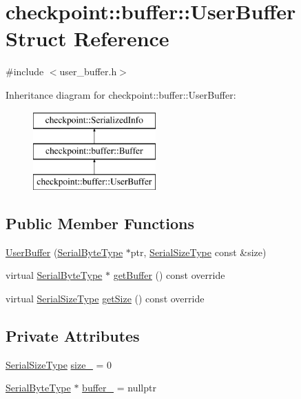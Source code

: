 \hypertarget{structcheckpoint_1_1buffer_1_1_user_buffer}{}\section{checkpoint\+:\+:buffer\+:\+:User\+Buffer Struct Reference}
\label{structcheckpoint_1_1buffer_1_1_user_buffer}


{\ttfamily \#include $<$user\+\_\+buffer.\+h$>$}

Inheritance diagram for checkpoint\+:\+:buffer\+:\+:User\+Buffer\+:\begin{figure}[H]
\begin{center}
\leavevmode
\includegraphics[height=3.000000cm]{structcheckpoint_1_1buffer_1_1_user_buffer}
\end{center}
\end{figure}
\subsection*{Public Member Functions}
\begin{DoxyCompactItemize}
\item 
\hyperlink{structcheckpoint_1_1buffer_1_1_user_buffer_a279907471bfa758ae71d922443973693}{User\+Buffer} (\hyperlink{namespacecheckpoint_ae57f01cdc0b81776c23b6c7c934c58f5}{Serial\+Byte\+Type} $\ast$ptr, \hyperlink{namespacecheckpoint_a083f6674da3f94c2901b18c6d238217c}{Serial\+Size\+Type} const \&size)
\item 
virtual \hyperlink{namespacecheckpoint_ae57f01cdc0b81776c23b6c7c934c58f5}{Serial\+Byte\+Type} $\ast$ \hyperlink{structcheckpoint_1_1buffer_1_1_user_buffer_a1a71a6378472d56c8c17f01dd44462b7}{get\+Buffer} () const override
\item 
virtual \hyperlink{namespacecheckpoint_a083f6674da3f94c2901b18c6d238217c}{Serial\+Size\+Type} \hyperlink{structcheckpoint_1_1buffer_1_1_user_buffer_a434e7feda041957509ee08791d3f4949}{get\+Size} () const override
\end{DoxyCompactItemize}
\subsection*{Private Attributes}
\begin{DoxyCompactItemize}
\item 
\hyperlink{namespacecheckpoint_a083f6674da3f94c2901b18c6d238217c}{Serial\+Size\+Type} \hyperlink{structcheckpoint_1_1buffer_1_1_user_buffer_ab7b3c105260719bef32d955384279722}{size\+\_\+} = 0
\item 
\hyperlink{namespacecheckpoint_ae57f01cdc0b81776c23b6c7c934c58f5}{Serial\+Byte\+Type} $\ast$ \hyperlink{structcheckpoint_1_1buffer_1_1_user_buffer_a7fb5fb2686430c6a73572e835343c516}{buffer\+\_\+} = nullptr
\end{DoxyCompactItemize}


